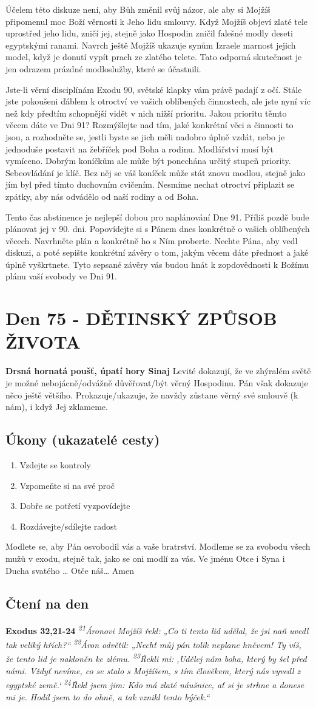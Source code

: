 \documentclass[11pt]{article}
\newcommand{\zacatekJedenactyTyden}{
\textbf{Drsná hornatá poušť, úpatí hory Sinaj} \newline 
Levité dokazují, že ve zhýralém světě je možné nebojácně/odvážně důvěřovat/být věrný Hospodinu. Pán však dokazuje něco ještě většího. Prokazuje/ukazuje, že navždy zůstane věrný své smlouvě (k nám), i když Jej zklameme.

\subsection*{Úkony (ukazatelé cesty)}
\begin{enumerate}
  \item Vzdejte se kontroly
  \item Vzpomeňte si na své proč
  \item Dobře se potřetí vyzpovídejte
  \item Rozdávejte/sdílejte radost
\end{enumerate}
Modlete se, aby Pán osvobodil vás a vaše bratrství. \newline
Modleme se za svobodu všech mužů v exodu, stejně tak, jako se oni modlí za vás.\newline
Ve jménu Otce i Syna i Ducha svatého …  Otče náš… Amen
}
\begin{document}
Účelem této diskuze není, aby Bůh změnil svůj názor, ale aby si Mojžíš připomenul moc Boží věrnosti k Jeho lidu smlouvy. Když
Mojžíš objeví zlaté tele uprostřed jeho lidu, zničí jej, stejně jako Hospodin zničil falešné modly deseti egyptskými ranami. Navrch
ještě Mojžíš ukazuje synům Izraele marnost jejich model, když je donutí vypít prach ze zlatého telete. Tato odporná skutečnost je
jen odrazem prázdné modloslužby, které se účastnili.

Jste-li věrní disciplínám Exodu 90, světské klapky vám právě padají z očí. Stále jste pokoušeni ďáblem k otroctví ve vašich
oblíbených činnostech, ale jste nyní víc než kdy předtím schopnější vidět v nich nižší prioritu. Jakou prioritu těmto věcem dáte ve
Dni 91? Rozmýšlejte nad tím, jaké konkrétní věci a činnosti to jsou, a rozhodněte se, jestli byste se jich měli nadobro úplně vzdát,
nebo je jednoduše postavit na žebříček pod Boha a rodinu. Modlářství musí být vymíceno. Dobrým koníčkům ale může být
ponechána určitý stupeň priority. Sebeovládání je klíč. Bez něj se váš koníček může stát znovu modlou, stejně jako jím byl před
tímto duchovním cvičením. Nesmíme nechat otroctví připlazit se zpátky, aby nás odvádělo od naší rodiny a od Boha.

Tento čas abstinence je nejlepší dobou pro naplánování Dne 91. Příliš pozdě bude plánovat jej v 90. dni. Popovídejte si s Pánem
dnes konkrétně o vašich oblíbených věcech. Navrhněte plán a konkrétně ho s Ním proberte. Nechte Pána, aby vedl diskuzi, a poté
sepište konkrétní závěry o tom, jakým věcem dáte přednost a jaké úplně vyškrtnete. Tyto sepsané závěry vás budou hnát
k zopdovědnosti k Božímu plánu vaší svobody ve Dni 91.



\newpage
\section{Den 75 - DĚTINSKÝ ZPŮSOB ŽIVOTA}
\zacatekJedenactyTyden
\subsection*{Čtení na den}
\textbf{Exodus 32,21-24}
\newline
\textit{
\textsuperscript{21}Áronovi Mojžíš řekl: „Co ti tento lid udělal, že jsi naň uvedl tak veliký hřích?“
\textsuperscript{22}Áron odvětil: „Nechť můj pán tolik neplane hněvem! Ty víš, že tento lid je nakloněn ke zlému.
\textsuperscript{23}Řekli mi: ‚Udělej nám boha, který by šel před námi. Vždyť nevíme, co se stalo s Mojžíšem, s tím člověkem, který nás vyvedl z egyptské země.‘
\textsuperscript{24}Řekl jsem jim: Kdo má zlaté náušnice, ať si je strhne a donese mi je. Hodil jsem to do ohně, a tak vznikl tento býček.“  
}
\end{document}

